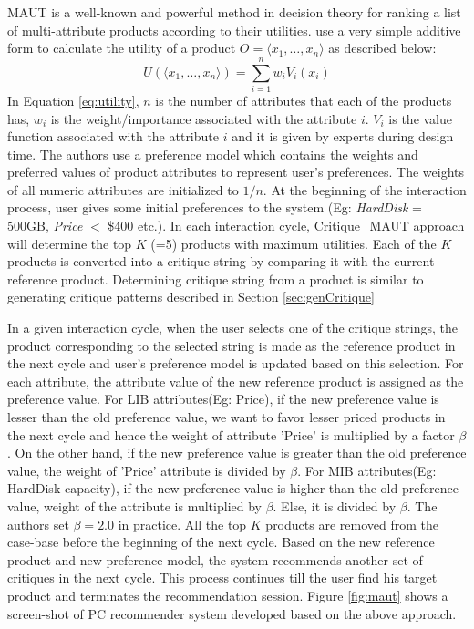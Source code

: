 MAUT is a well-known  and powerful method in decision theory for ranking a list of multi-attribute products according to their utilities.
\cite{mautPaper} use a very simple additive form to calculate the utility of a product $O = \langle x_1,\hdots,x_n\rangle$ as described below:
\begin{equation}
\label{eq:utility}
U(\langle x_1,\hdots,x_n \rangle) = \sum_{i=1}^n w_iV_i(x_i)
\end{equation}
%
In Equation \ref{eq:utility}, $n$ is the number of attributes that each of the products has, $w_i$ is the weight/importance associated with the attribute $i$. 
$V_i$ is the value function associated with the attribute $i$ and it is given by experts during design time.
The authors use a preference model which contains the weights and preferred values of product attributes to represent user's preferences.
The weights of all numeric attributes are initialized to $1/n$.
At the beginning of the interaction process, user gives some initial preferences to the system (Eg: \textit{HardDisk} = 500GB, \textit{Price} $<$ \$400 etc.).
In each interaction cycle, Critique\_MAUT approach will determine the top $K$ (=5) products with maximum utilities.
Each of the $K$ products is converted into a critique string by comparing it with the current reference product.
Determining critique string from a product is similar to generating critique patterns described in Section \ref{sec:genCritique}

In a given interaction cycle, when the user selects one of the critique strings, the product corresponding to the selected string is made as the reference product in the next cycle and user's preference model is updated based on this selection.
For each attribute, the attribute value of the new reference product is assigned as the preference value.
For LIB attributes(Eg: Price), if the new preference value is lesser than the old preference value, we want to favor lesser priced products in the next cycle and hence the weight of attribute 'Price' is multiplied by a factor $\beta$.
On the other hand, if the new preference value is greater than the old preference value, the weight of 'Price' attribute is divided by $\beta$.
For MIB attributes(Eg: HardDisk capacity), if the new preference value is higher than the old preference value, weight of the attribute is multiplied by $\beta$. Else, it is divided by $\beta$.
The authors set $\beta = 2.0$ in practice.
All the top $K$ products are removed from the case-base before the beginning of the next cycle.
Based on the new reference product and new preference model, the system recommends another set of critiques in the next cycle.
This process continues till the user find his target product and terminates the recommendation session.
Figure \ref{fig:maut} shows a screen-shot of PC recommender system developed based on the above approach.

